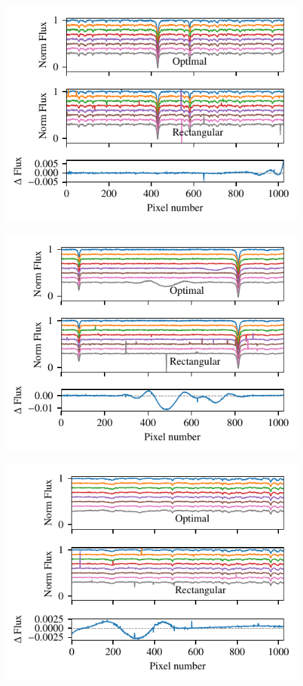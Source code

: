  \begin{figure}
     \centering
     \includegraphics[width=0.7\linewidth]{figures/reduction/bp_plots/extraction_comparision_HD4747-1_chip_1}
     \caption{}
     \label{fig:extractioncomparisionhd4747-1chip1}
 \end{figure}
 \begin{figure}
     \centering
     \includegraphics[width=0.7\linewidth]{figures/reduction/bp_plots/extraction_comparision_HD4747-1_chip_2}
     \caption{}
     \label{fig:extractioncomparisionhd4747-1chip2}
 \end{figure}
 \begin{figure}
     \centering
     \includegraphics[width=0.7\linewidth]{figures/reduction/bp_plots/extraction_comparision_HD4747-1_chip_3}
     \caption{}
     \label{fig:extractioncomparisionhd4747-1chip3}
 \end{figure}
